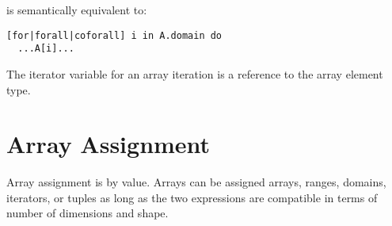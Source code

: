 is semantically equivalent to:

\begin{chapel}
\begin{verbatim}
[for|forall|coforall] i in A.domain do
  ...A[i]...
\end{verbatim}
\end{chapel}

The iterator variable for an array iteration is a reference to the
array element type.


\pagebreak
\section{Array Assignment}
\label{Array_Assignment}

Array assignment is by value.  Arrays can be assigned arrays, ranges,
domains, iterators, or tuples as long as the two expressions are
compatible in terms of number of dimensions and shape.

